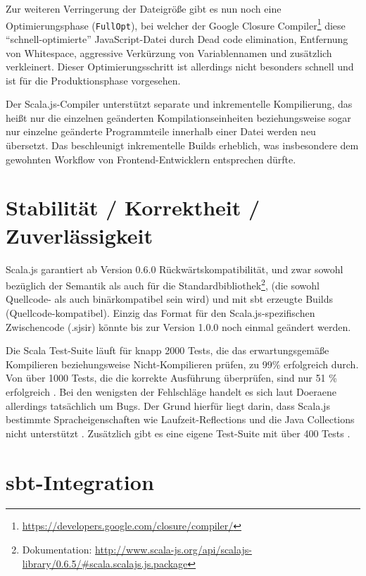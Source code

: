 \documentclass[a4paper, 12pt, hidelinks, listof=totoc, listoftables=totoc, bibliography=totoc]{scrreprt}
\newcommand{\code}[1]{\lstinline[language=Scala, style=inline]|#1|}
\begin{document}
Zur weiteren Verringerung der Dateigröße gibt es nun noch eine Optimierungsphase (\code{FullOpt}), bei welcher der Google Closure Compiler\footnote{\url{https://developers.google.com/closure/compiler/}} diese "`schnell-optimierte"' JavaScript-Datei durch Dead code elimination, Entfernung von Whitespace, aggressive Verkürzung von Variablennamen und zusätzlich verkleinert. Dieser Optimierungsschritt ist allerdings nicht besonders schnell und ist für die Produktionsphase vorgesehen.
\cite[Vgl.][]{scalajs.DCO}\cite[Vgl.][\#HowCompilationWorks]{haoyi.HOS}

Der Scala.js-Compiler unterstützt separate und inkrementelle Kompilierung, das heißt nur die einzelnen geänderten Kompilationseinheiten beziehungsweise sogar nur einzelne geänderte Programmteile innerhalb einer Datei werden neu übersetzt. Das beschleunigt inkrementelle Builds erheblich, was insbesondere dem gewohnten Workflow von Frontend-Entwicklern entsprechen dürfte.


\section{Stabilität / Korrektheit / Zuverlässigkeit}

Scala.js garantiert ab Version 0.6.0 Rückwärtskompatibilität, und zwar sowohl bezüglich der Semantik als auch für die Standardbibliothek\footnote{Dokumentation: \url{http://www.scala-js.org/api/scalajs-library/0.6.5/\#scala.scalajs.js.package}}, (die sowohl Quellcode- als auch binärkompatibel sein wird) und mit sbt erzeugte Builds (Quellcode-kompatibel). Einzig das Format für den Scala.js-spezifischen Zwischencode (.sjsir) könnte bis zur Version 1.0.0 noch einmal geändert werden.

Die Scala Test-Suite läuft für knapp 2000 Tests, die das erwartungsgemäße Kompilieren beziehungsweise Nicht-Kompilieren prüfen, zu 99\% erfolgreich durch. Von über 1000 Tests, die die korrekte Ausführung überprüfen, sind nur 51 \% erfolgreich \cite[Folie 36, Min. 35]{doeraene2014.WHB}. Bei den wenigsten der Fehlschläge handelt es sich laut Doeraene allerdings tatsächlich um Bugs. Der Grund hierfür liegt darin, dass Scala.js bestimmte Spracheigenschaften wie Laufzeit-Reflections und die Java Collections nicht unterstützt \cite[S. 7]{doeraene2013.TDI}. Zusätzlich gibt es eine eigene Test-Suite mit über 400 Tests \cite[Folie 36, Min. 35]{doeraene2014.WHB}.


\section{sbt-Integration}
\end{document}

